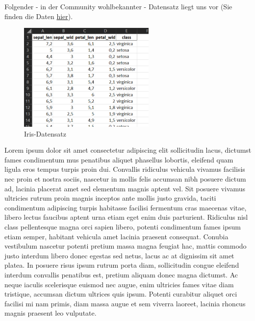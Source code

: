 \documentclass[
  oneside]{book}
\theoremstyle{definition}
\theoremstyle{definition}
\theoremstyle{definition}
\theoremstyle{definition}
\theoremstyle{remark}
\begin{document}
Folgender - in der Community wohlbekannter - Datensatz liegt uns vor (Sie finden die Daten \href{https://syncandshare.lrz.de/getlink/fi89kxTJ5yLRaW5mnpyrofVK/Iris_p.xlsx}{hier}).

\begin{figure}
\centering
\includegraphics[width=0.6\textwidth,height=\textheight]{assets/image-20211209101425856.png}
\caption[Iris-Datensatz ]{Iris-Datensatz \footnotemark{}}
\end{figure}

Lorem ipsum dolor sit amet consectetur adipiscing elit sollicitudin lacus, dictumst fames condimentum mus penatibus aliquet phasellus lobortis, eleifend quam ligula eros tempus turpis proin dui. Convallis ridiculus vehicula vivamus facilisis nec proin et nostra sociis, nascetur in mollis felis accumsan nibh posuere dictum ad, lacinia placerat amet sed elementum magnis aptent vel. Sit posuere vivamus ultricies rutrum proin magnis inceptos ante mollis justo gravida, taciti condimentum adipiscing turpis habitasse facilisi fermentum cras maecenas vitae, libero lectus faucibus aptent urna etiam eget enim duis parturient. Ridiculus nisl class pellentesque magna orci sapien libero, potenti condimentum fames ipsum etiam semper, habitant vehicula amet lacinia praesent consequat. Conubia vestibulum nascetur potenti pretium massa magna feugiat hac, mattis commodo justo interdum libero donec egestas sed netus, lacus ac at dignissim sit amet platea. In posuere risus ipsum rutrum porta diam, sollicitudin congue eleifend interdum convallis penatibus est, pretium aliquam donec magna dictumst. Ac neque iaculis scelerisque euismod nec augue, enim ultricies fames vitae diam tristique, accumsan dictum ultrices quis ipsum. Potenti curabitur aliquet orci facilisi mi nam primis, diam massa augue et sem viverra laoreet, lacinia rhoncus magnis praesent leo vulputate.
\end{document}
